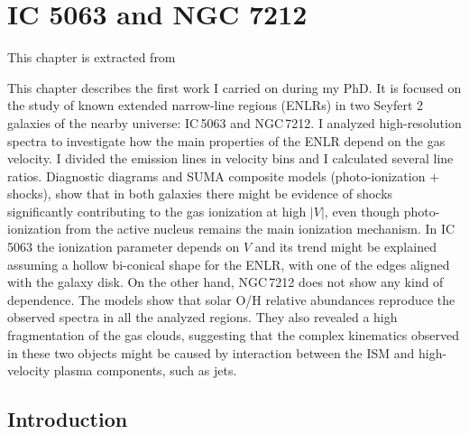 \documentclass[../main.tex]{subfiles}
\begin{document}
\chapter[IC 5063 and NGC 7212]{IC 5063 and NGC 7212}
\label{cap:paper1}

\epigraph{This chapter is extracted from \citet{Congiu17b}}{}

This chapter describes the first work I carried on during my PhD.
It is focused on the study of known extended narrow-line regions (ENLRs) in two Seyfert 2 galaxies of the nearby universe: IC\,5063 and NGC\,7212.
I analyzed high-resolution spectra to investigate how the main properties of the ENLR depend on the gas velocity.
I divided the emission lines in velocity bins and I calculated several line ratios.
Diagnostic diagrams and SUMA composite models (photo-ionization $+$ shocks), show that in both galaxies there might be evidence of shocks significantly contributing to the gas ionization at high $\lvert V \rvert$, even though photo-ionization from the active nucleus remains the main ionization mechanism.
In IC\,5063 the ionization parameter depends on $V$ and its trend might be explained assuming a hollow bi-conical shape for the ENLR, with one of the edges aligned with the galaxy disk.
On the other hand, NGC\,7212 does not show any kind of dependence.
The models show that solar O/H relative abundances reproduce the observed spectra in all the analyzed regions.
They also revealed a high fragmentation of the gas clouds, suggesting that the complex kinematics observed in these two objects might be caused by interaction between the ISM and high-velocity plasma components, such as jets.

\section{Introduction}
\end{document}
